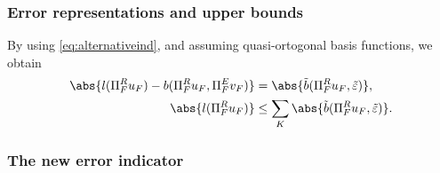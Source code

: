 \subsubsection{Error representations and upper bounds}
By using \cref{eq:alternativeind}, and assuming quasi-ortogonal basis functions, we obtain
\begin{align}
  \abs{l(\Pi_{F}^{R} u_{F}) - b(\Pi_{F}^{R} u_{F}, \Pi_{F}^{E} v_{F})} & = \abs{\tilde{b}(\Pi_{F}^{R} u_{F}, \tilde{\varepsilon})},                                      \\
  \abs{l(\Pi_{F}^{R} u_{F})}                                           & \leq \sum_{K} \abs{\tilde{b}(\Pi_{F}^{R} u_{F}, \tilde{\varepsilon})}. \label{eq:altupperbound}
\end{align}

\subsubsection{The new error indicator}
%

